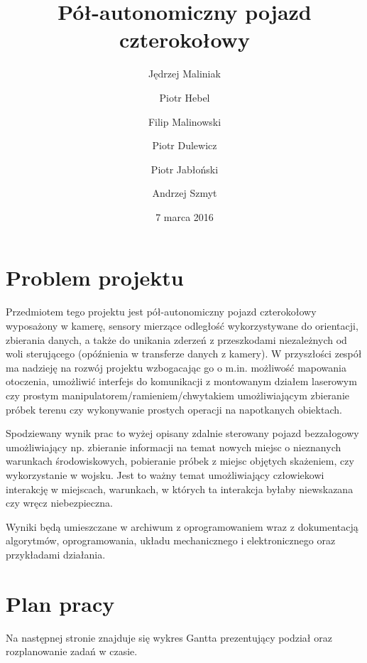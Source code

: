 \documentclass[a4paper]{article}
\title{Pół-autonomiczny pojazd czterokołowy}
\author{Jędrzej Maliniak \and Piotr Hebel \and Filip Malinowski \and Piotr Dulewicz \and Piotr Jabłoński \and Andrzej Szmyt}
\date{7 marca 2016}
\begin{document}
\maketitle

\section{Problem projektu}
    Przedmiotem tego projektu jest pół-autonomiczny pojazd czterokołowy wyposażony w kamerę, sensory mierzące odległość wykorzystywane do orientacji, zbierania danych, a także do unikania zderzeń z przeszkodami niezależnych od woli sterującego (opóźnienia w transferze danych z kamery). W przyszłości zespół ma nadzieję na rozwój projektu wzbogacając go o m.in. możliwość mapowania otoczenia, umożliwić interfejs do komunikacji z montowanym działem laserowym czy prostym manipulatorem/ramieniem/chwytakiem umożliwiającym zbieranie próbek terenu czy wykonywanie prostych operacji na napotkanych obiektach.
    
    Spodziewany wynik prac to wyżej opisany zdalnie sterowany pojazd bezzałogowy umożliwiający np. zbieranie informacji na temat nowych miejsc o nieznanych warunkach środowiskowych, pobieranie próbek z miejsc objętych skażeniem, czy wykorzystanie w wojsku. Jest to ważny temat umożliwiający człowiekowi interakcję w miejscach, warunkach, w których ta interakcja byłaby niewskazana czy wręcz niebezpieczna. 

    Wyniki będą umieszczane w archiwum z oprogramowaniem wraz z dokumentacją algorytmów, oprogramowania, układu mechanicznego i elektronicznego oraz przykładami działania.
\section{Plan pracy}
    Na następnej stronie znajduje się wykres Gantta prezentujący podział oraz rozplanowanie zadań w czasie.
    
\end{document}
